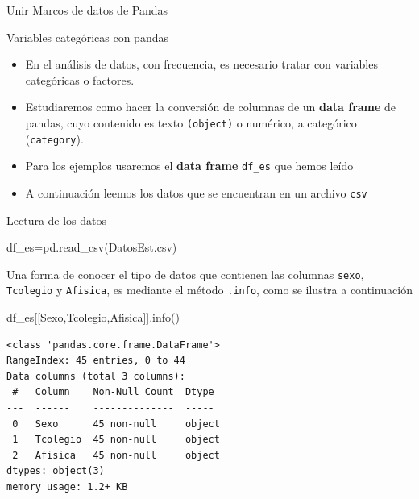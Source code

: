 \documentclass[
  ignorenonframetext,
  aspectratio=169,
  spanish,
]{beamer}
\newenvironment{Shaded}{\begin{snugshade}}{\end{snugshade}}
\newcommand{\NormalTok}[1]{\textcolor[rgb]{0.00,0.23,0.31}{#1}}
\newcommand{\OperatorTok}[1]{\textcolor[rgb]{0.37,0.37,0.37}{#1}}
\newcommand{\StringTok}[1]{\textcolor[rgb]{0.13,0.47,0.30}{#1}}
\begin{document}
\begin{frame}[fragile]{Unir Marcos de datos de Pandas}
\begin{block}{Variables categóricas con pandas}
\label{sec-VariablesCatPandas}

\begin{itemize}
\item
  En el análisis de datos, con frecuencia, es necesario tratar con
  variables categóricas o factores.
\item
  Estudiaremos como hacer la conversión de columnas de un \textbf{data
  frame} de pandas, cuyo contenido es texto \texttt{(object)} o
  numérico, a categórico (\texttt{category}).
\item
  Para los ejemplos usaremos el \textbf{data frame} \texttt{df\_es} que
  hemos leído
\item
  A continuación leemos los datos que se encuentran en un archivo
  \texttt{csv}
\end{itemize}
\end{block}

\begin{block}{Lectura de los datos}
\label{lectura-de-los-datos}
\begin{Shaded}
\begin{Highlighting}[]
\NormalTok{df\_es}\OperatorTok{=}\NormalTok{pd.read\_csv(}\StringTok{\textquotesingle{}DatosEst.csv\textquotesingle{}}\NormalTok{)}
\end{Highlighting}
\end{Shaded}

Una forma de conocer el tipo de datos que contienen las columnas
\texttt{sexo}, \texttt{Tcolegio} y \texttt{Afisica}, es mediante el
método \texttt{.info}, como se ilustra a continuación

\begin{Shaded}
\begin{Highlighting}[]
\NormalTok{df\_es[[}\StringTok{\textquotesingle{}Sexo\textquotesingle{}}\NormalTok{,}\StringTok{\textquotesingle{}Tcolegio\textquotesingle{}}\NormalTok{,}\StringTok{\textquotesingle{}Afisica\textquotesingle{}}\NormalTok{]].info()}
\end{Highlighting}
\end{Shaded}

\begin{verbatim}
<class 'pandas.core.frame.DataFrame'>
RangeIndex: 45 entries, 0 to 44
Data columns (total 3 columns):
 #   Column    Non-Null Count  Dtype 
---  ------    --------------  ----- 
 0   Sexo      45 non-null     object
 1   Tcolegio  45 non-null     object
 2   Afisica   45 non-null     object
dtypes: object(3)
memory usage: 1.2+ KB
\end{verbatim}
\end{block}


\end{frame}
\end{document}
